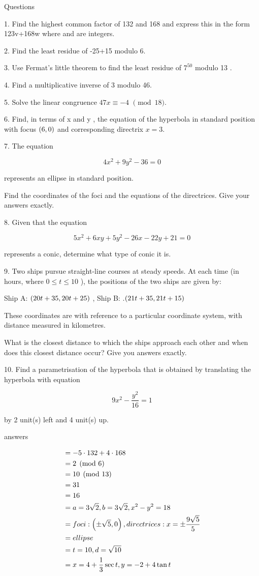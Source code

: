 \documentclass{article}
\begin{document}
Questions

1. Find the highest common factor of 132  and 168 and express this in the form 123v+168w  
where and  are integers.

2. Find the least residue of -25+15 modulo 6.

3. Use Fermat's little theorem to find the least residue of \( 7^{50} \) modulo 13 .

4. Find a multiplicative inverse of 3 modulo 46.

5. Solve the linear congruence  \( 47x \equiv -4 \)  \( \pmod{18} \).

6. Find, in terms of x and y , the equation of the hyperbola in standard position with focus \( \left(6,0\right) \)   
and corresponding directrix \( x=3 \).

7. The equation

\[ 4x^2 +9y^2 -36 = 0 \]

represents an ellipse in standard position.

Find the coordinates of the foci and the equations of the directrices. Give your answers exactly.

8.  Given that the equation

\[ 5x^2 + 6xy +5y^2 -26x -22y +21 = 0 \]

represents a conic, determine what type of conic it is.

9. Two ships pursue straight-line courses at steady speeds. At each time  (in hours, where \( 0\leq t \leq 10 \) ),  the positions of the two ships are given by:

Ship A: \( \left(20t+35,20t+25\right) \) ,
Ship B: .\( \left(21t+35,21t+15\right) \)

These coordinates are with reference to a particular coordinate system, with distance measured in kilometres.

 

What is the closest distance to which the ships approach each other and when does this closest distance occur? Give you answers exactly.

10. Find a parametrisation of the hyperbola that is obtained by translating the hyperbola with equation

\[ 9x^2 - \frac{y^2}{16} = 1 \]

by 2 unit(s) left and 4 unit(s) up.


answers

\begin{align}
    &=  -5\cdot{132} + 4\cdot{168}\\
    &=  2 \pmod{6}\\
    &=  10 \pmod{13}\\
    &=  31\\
    &=  16\\
    &=  a= 3\sqrt{2}, b = 3\sqrt{2}, x^2 - y^2 = 18\\
    &=  foci: \left(\pm\sqrt{5},0\right), directrices: x = \pm \frac{9\sqrt{5}}{5}\\
    &=  ellipse\\
    &=  t=10, d=\sqrt{10}\\
    &=  x = 4 + \frac{1}{3}\sec{t}, y = -2 + 4\tan{t} 
\end{align}
\end{document}
